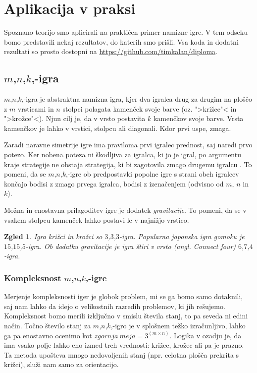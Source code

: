 \documentclass[12pt,a4paper]{amsart}
\theoremstyle{definition} %
\theoremstyle{plain} %
\newtheorem{zgled}[definicija]{Zgled}
\begin{document}
\section{Aplikacija v praksi}
Spoznano teorijo smo aplicirali na praktičen primer namizne igre. V tem odseku bomo predstavili 
nekaj rezultatov, do katerih smo prišli. Vsa koda in dodatni rezultati so prosto dostopni na 
\href{https://github.com/timkalan/diploma}{https://github.com/timkalan/diploma}.

\subsection{$m$,$n$,$k$,-igra}
$m$,$n$,$k$,-igra je abstraktna namizna igra, kjer dva igralca drug za drugim na ploščo z $m$ 
vrsticami in $n$ stolpci polagata kamenček svoje barve (oz. ">križce"< in ">krožce"<). Njun cilj 
je, da v vrsto postavita $k$ kamenčkov svoje barve. Vrsta kamenčkov je lahko v vrstici, stolpcu 
ali diagonali. Kdor prvi uspe, zmaga. 

Zaradi naravne simetrije igre ima praviloma prvi igralec prednost, saj naredi prvo potezo. Ker nobena 
poteza ni škodljiva za igralca, ki jo je igral, po argumentu kraje strategije ne obstaja strategija, 
ki bi zagotovila zmago drugemu igralcu \cite{SSA}. To pomeni, da se $m$,$n$,$k$,-igre ob predpostavki 
popolne igre s strani obeh igralcev končajo bodisi z zmago prvega igralca, bodisi z izenačenjem 
(odvisno od $m$, $n$ in $k$).

Možna in enostavna prilagoditev igre je dodatek \textit{gravitacije}. To pomeni, da se v vsakem
stolpcu kamenček lahko postavi le v najnižjo vrstico.

\begin{zgled}
    Igra križci in krožci so $3$,$3$,$3$-igra. Popularna japonska igra gomoku je 
    $15$,$15$,$5$-igra. Ob dodatku gravitacije je igra štiri v vrsto (angl. \textit{Connect four}) 
    $6$,$7$,$4$-igra.
\end{zgled}

\subsubsection{Kompleksnost $m$,$n$,$k$,-igre}
Merjenje kompleksnosti iger je globok problem, mi se ga bomo samo dotaknili, saj nam lahko da idejo 
o velikostnih razredih problemov, ki jih rešujemo. Kompleksnost bomo merili izključno v smislu števila 
stanj, to pa seveda ni edini način. Točno število stanj za $m$,$n$,$k$,-igro je v splošnem težko 
izračunljivo, lahko ga pa enostavno ocenimo kot $zgornja~meja = 3 ^ {(m \times n)}$. Logika v ozadju je, 
da ima vsako polje lahko eno izmed treh vrednosti: križec, krožec ali pa je prazno. Ta metoda upošteva 
mnogo nedovoljenih stanj (npr. celotna plošča prekrita s križci), služi nam samo za orientacijo.
\end{document}
